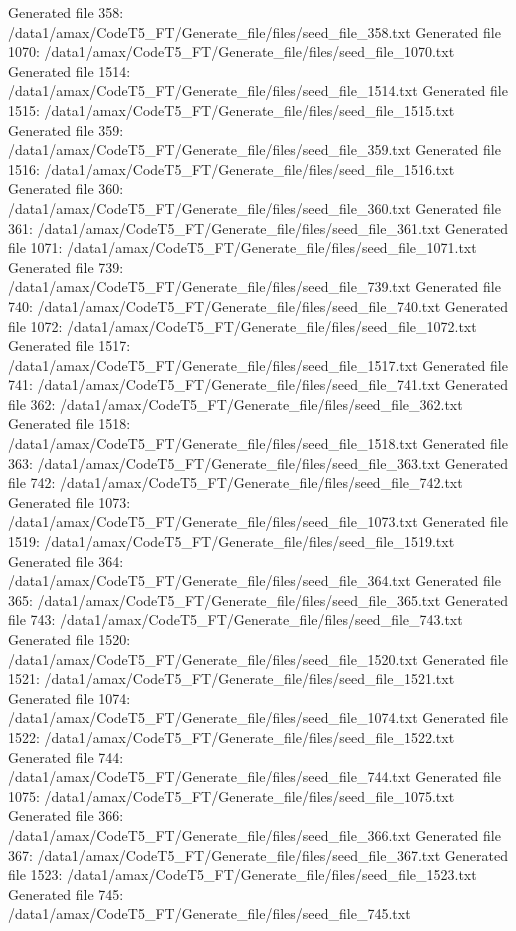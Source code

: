 Generated file 358: /data1/amax/CodeT5_FT/Generate_file/files/seed_file_358.txt
Generated file 1070: /data1/amax/CodeT5_FT/Generate_file/files/seed_file_1070.txt
Generated file 1514: /data1/amax/CodeT5_FT/Generate_file/files/seed_file_1514.txt
Generated file 1515: /data1/amax/CodeT5_FT/Generate_file/files/seed_file_1515.txt
Generated file 359: /data1/amax/CodeT5_FT/Generate_file/files/seed_file_359.txt
Generated file 1516: /data1/amax/CodeT5_FT/Generate_file/files/seed_file_1516.txt
Generated file 360: /data1/amax/CodeT5_FT/Generate_file/files/seed_file_360.txt
Generated file 361: /data1/amax/CodeT5_FT/Generate_file/files/seed_file_361.txt
Generated file 1071: /data1/amax/CodeT5_FT/Generate_file/files/seed_file_1071.txt
Generated file 739: /data1/amax/CodeT5_FT/Generate_file/files/seed_file_739.txt
Generated file 740: /data1/amax/CodeT5_FT/Generate_file/files/seed_file_740.txt
Generated file 1072: /data1/amax/CodeT5_FT/Generate_file/files/seed_file_1072.txt
Generated file 1517: /data1/amax/CodeT5_FT/Generate_file/files/seed_file_1517.txt
Generated file 741: /data1/amax/CodeT5_FT/Generate_file/files/seed_file_741.txt
Generated file 362: /data1/amax/CodeT5_FT/Generate_file/files/seed_file_362.txt
Generated file 1518: /data1/amax/CodeT5_FT/Generate_file/files/seed_file_1518.txt
Generated file 363: /data1/amax/CodeT5_FT/Generate_file/files/seed_file_363.txt
Generated file 742: /data1/amax/CodeT5_FT/Generate_file/files/seed_file_742.txt
Generated file 1073: /data1/amax/CodeT5_FT/Generate_file/files/seed_file_1073.txt
Generated file 1519: /data1/amax/CodeT5_FT/Generate_file/files/seed_file_1519.txt
Generated file 364: /data1/amax/CodeT5_FT/Generate_file/files/seed_file_364.txt
Generated file 365: /data1/amax/CodeT5_FT/Generate_file/files/seed_file_365.txt
Generated file 743: /data1/amax/CodeT5_FT/Generate_file/files/seed_file_743.txt
Generated file 1520: /data1/amax/CodeT5_FT/Generate_file/files/seed_file_1520.txt
Generated file 1521: /data1/amax/CodeT5_FT/Generate_file/files/seed_file_1521.txt
Generated file 1074: /data1/amax/CodeT5_FT/Generate_file/files/seed_file_1074.txt
Generated file 1522: /data1/amax/CodeT5_FT/Generate_file/files/seed_file_1522.txt
Generated file 744: /data1/amax/CodeT5_FT/Generate_file/files/seed_file_744.txt
Generated file 1075: /data1/amax/CodeT5_FT/Generate_file/files/seed_file_1075.txt
Generated file 366: /data1/amax/CodeT5_FT/Generate_file/files/seed_file_366.txt
Generated file 367: /data1/amax/CodeT5_FT/Generate_file/files/seed_file_367.txt
Generated file 1523: /data1/amax/CodeT5_FT/Generate_file/files/seed_file_1523.txt
Generated file 745: /data1/amax/CodeT5_FT/Generate_file/files/seed_file_745.txt
